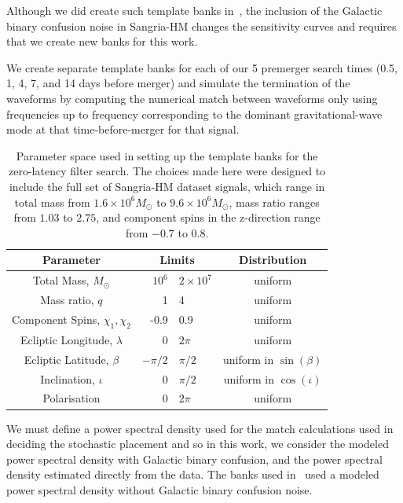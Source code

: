 \documentclass[%
 reprint,
superscriptaddress,
 nofootinbib,
 amsmath,amssymb,
 aps,
 prd,
]{revtex4-2}
\newcommand{\updated}[1]{#1}
\newcommand{\strutrow}{\rule{0pt}{2.5ex}} %
\begin{document}
Although we did create such template banks in~\cite{CabournDavies:2024hea}, the inclusion of the
Galactic binary confusion noise in Sangria-HM changes the sensitivity curves and requires that we create new banks for this work. 

We create separate template banks for each of our 5 premerger search times (0.5, 1, 4, 7, and 14 days before merger) and simulate the termination of the waveforms by computing the numerical
match between waveforms only using frequencies up to frequency corresponding to the dominant gravitational-wave mode at that time-before-merger for that signal. 


\begin{table}[ht]
\begin{centering}
\begin{tabular}{|c|r @{ -- } l|c|}
\hline
  Parameter & \multicolumn{2}{c|}{Limits} & Distribution\\
  \hline
  \strutrow Total Mass, $M_\odot$ & $10^6$ & $2\times 10^7$ & uniform \\
  Mass ratio, $q$ & 1 & 4 & uniform \\
  Component Spins, $\chi_1, \chi_2$ & -0.9 & 0.9 & uniform\\
  Ecliptic Longitude, $\lambda$ & 0 & $2\pi$ & uniform \\
  Ecliptic Latitude, $\beta$ & $-\pi / 2$ & $\pi / 2$ & uniform in $\sin(\beta)$\\
  Inclination, $\iota$ & 0 & $\pi / 2$ & uniform in $\cos(\iota)$ \\
  Polarisation & 0 & $2 \pi$ & uniform \\  
\hline
\end{tabular}
\caption{Parameter space used in setting up the template banks for the zero-latency filter search.
\updated{The choices made here were designed to include the full set of Sangria-HM dataset signals, which range in total mass from $1.6\times 10^6 M_\odot$ to $9.6\times 10^6 M_\odot$, mass ratio ranges from $1.03$ to $2.75$, and component spins in the z-direction range from $-0.7$ to $0.8$.}
\label{tab:parameter_space}
}
\end{centering}
\end{table}

We must define a power spectral density used for the match calculations used in deciding the stochastic placement and so in this work, we consider
the modeled power spectral density with Galactic binary confusion, and the power spectral density estimated directly from the data.
The banks used in~\cite{CabournDavies:2024hea} used a modeled power spectral density without Galactic binary confusion noise.
\end{document}
